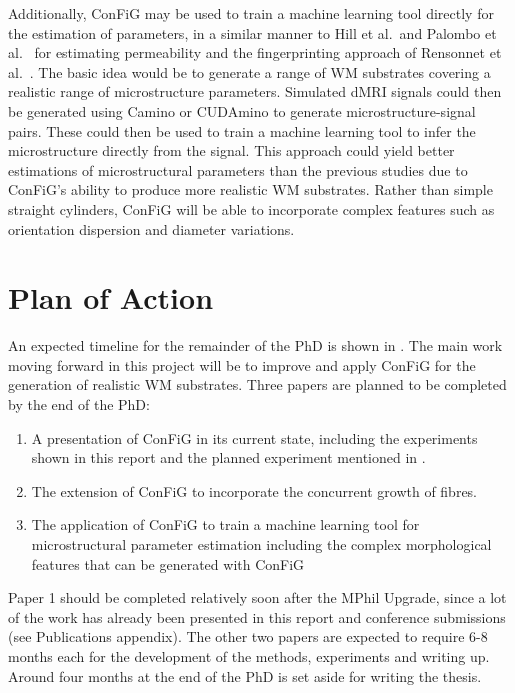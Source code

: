 Additionally, \ac{ConFiG} may be used to train a machine learning tool directly for the estimation of parameters, in a similar manner to Hill et al.\ and Palombo et al.\ \cite{Hill2018,Palombo2018a} for estimating permeability and the fingerprinting approach of Rensonnet et al.\ \cite{Rensonnet2018}.
The basic idea would be to generate a range of \ac{WM} substrates covering a realistic range of microstructure parameters.
Simulated \ac{dMRI} signals could then be generated using Camino or CUDAmino to generate microstructure-signal pairs.
These could then be used to train a machine learning tool to infer the microstructure directly from the signal.
This approach could yield better estimations of microstructural parameters than the previous studies due to \ac{ConFiG}'s ability to produce more realistic \ac{WM} substrates.
Rather than simple straight cylinders, \ac{ConFiG} will be able to incorporate complex features such as orientation dispersion and diameter variations. 


\section{Plan of Action}
\label{sec:future_plan_of_action}
An expected timeline for the remainder of the PhD is shown in . The main work moving forward in this project will be to improve and apply \ac{ConFiG} for the generation of realistic \ac{WM} substrates. Three papers are planned to be completed by the end of the PhD:
\begin{enumerate}
\item A presentation of \ac{ConFiG} in its current state, including the experiments shown in this report and the planned experiment mentioned in .
\item The extension of \ac{ConFiG} to incorporate the concurrent growth of fibres.
\item The application of \ac{ConFiG} to train a machine learning tool for microstructural parameter estimation including the complex morphological features that can be generated with \ac{ConFiG}
\end{enumerate}

Paper 1 should be completed relatively soon after the MPhil Upgrade, since a lot of the work has already been presented in this report and conference submissions (see Publications appendix).
The other two papers are expected to require 6-8 months each for the development of the methods, experiments and writing up. Around four months at the end of the PhD is set aside for writing the thesis.



